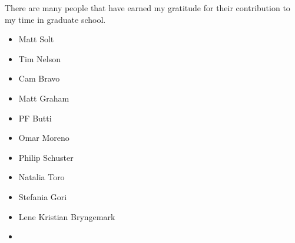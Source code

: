 
There are many people that have earned my gratitude for their contribution to my
time in graduate school.

\begin{itemize}
    \item Matt Solt
    \item Tim Nelson
    \item Cam Bravo
    \item Matt Graham
    \item PF Butti
    \item Omar Moreno
    \item Philip Schuster
    \item Natalia Toro
    \item Stefania Gori
    \item Lene Kristian Bryngemark
    \item
\end{itemize}

